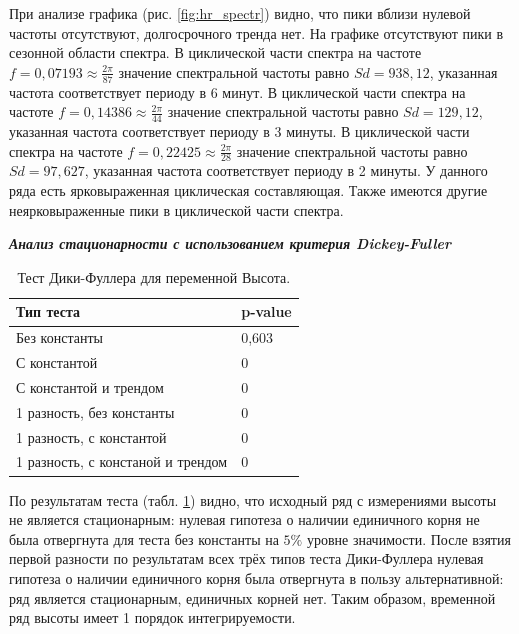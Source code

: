 \documentclass[a4paper,12pt]{article}
\begin{document}
При анализе графика (рис. \ref{fig:hr_spectr}) видно, что пики вблизи нулевой частоты отсутствуют, долгосрочного тренда нет. На графике отсутствуют пики в сезонной области спектра. 
В циклической части спектра на частоте $f = 0,07193 \approx \frac{2 \pi}{87}$ значение спектральной частоты равно $Sd = 938,12$, указанная частота соответствует периоду в 6 минут. 
В циклической части спектра на частоте $f = 0,14386 \approx \frac{2 \pi}{44}$ значение спектральной частоты равно $Sd = 129,12$, указанная частота соответствует периоду в 3 минуты.
В циклической части спектра на частоте $f = 0,22425 \approx \frac{2 \pi}{28}$ значение спектральной частоты равно $Sd = 97,627$, указанная частота соответствует периоду в 2 минуты.
У данного ряда есть ярковыраженная циклическая составляющая.
Также имеются другие неярковыраженные пики в циклической части спектра.

\textbf{\textit{Анализ стационарности с использованием критерия Dickey-Fuller}}

\begin{table}[H]
	\begin{center}
		\begin{tabular}{|l|l|}
			\hline
			Тип теста &p-value \\
			\hline
			Без константы &0,603 \\
			\hline
			С константой &0 \\
			\hline
			С константой и трендом &0 \\
			\hline
			1 разность, без константы & 0\\
			\hline
			1 разность, с константой & 0\\
			\hline
			1 разность, с констаной и трендом & 0\\
			\hline
		\end{tabular}
	\end{center}
	\caption{Тест Дики-Фуллера для переменной Высота.}
	\label{tab:DFele}
\end{table}

По результатам теста (табл. \ref{tab:DFele}) видно, что исходный ряд с измерениями высоты не является стационарным: нулевая гипотеза о наличии единичного корня не была отвергнута для теста без константы на $5\%$ уровне значимости. После взятия первой разности по результатам всех трёх типов теста Дики-Фуллера нулевая гипотеза о наличии единичного корня была отвергнута в пользу альтернативной: ряд является стационарным, единичных корней нет. Таким образом, временной ряд высоты имеет 1 порядок интегрируемости. 
\end{document}
